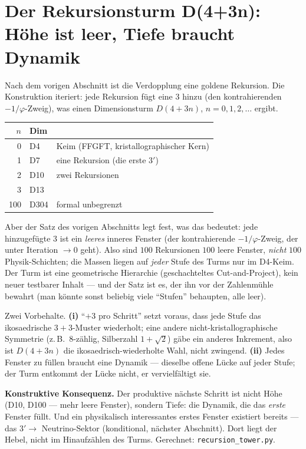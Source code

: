 \section{Der Rekursionsturm D(4+3n): H\"ohe ist leer, Tiefe braucht Dynamik}
Nach dem vorigen Abschnitt ist die Verdopplung eine goldene Rekursion. Die Konstruktion
iteriert: jede Rekursion f\"ugt eine $3$ hinzu (den kontrahierenden $-1/\varphi$-Zweig), was
einen Dimensionsturm $D(4+3n)$, $n=0,1,2,\dots$ ergibt.
\begin{center}\small\renewcommand{\arraystretch}{1.15}
\begin{tabular}{@{}r l l@{}}
\toprule
$n$ & Dim & \\
\midrule
0 & D4 & Keim (FFGFT, kristallographischer Kern) \\
1 & D7 & eine Rekursion (die erste $3'$) \\
2 & D10 & zwei Rekursionen \\
3 & D13 & \\
100 & D304 & formal unbegrenzt \\
\bottomrule
\end{tabular}
\end{center}
\noindent Aber der Satz des vorigen Abschnitts legt fest, was das bedeutet: jede hinzugef\"ugte
$3$ ist ein \emph{leeres} inneres Fenster (der kontrahierende $-1/\varphi$-Zweig, der unter
Iteration $\to0$ geht). Also sind $100$ Rekursionen $100$ leere Fenster, \emph{nicht} $100$
Physik-Schichten; die Massen liegen auf \emph{jeder} Stufe des Turms nur im D4-Keim. Der Turm
ist eine geometrische Hierarchie (geschachteltes Cut-and-Project), kein neuer testbarer Inhalt
--- und der Satz ist es, der ihn vor der Zahlenm\"uhle bewahrt (man k\"onnte sonst beliebig viele
\enquote{Stufen} behaupten, alle leer).

Zwei Vorbehalte. \textbf{(i)} \enquote{$+3$ pro Schritt} setzt voraus, dass jede Stufe das
ikosaedrische $3+3$-Muster wiederholt; eine andere nicht-kristallographische Symmetrie (z.\,B.\
$8$-z\"ahlig, Silberzahl $1+\sqrt2$) g\"abe ein anderes Inkrement, also ist $D(4+3n)$ die
ikosaedrisch-wiederholte Wahl, nicht zwingend. \textbf{(ii)} Jedes Fenster zu f\"ullen braucht
eine Dynamik --- dieselbe offene L\"ucke auf jeder Stufe; der Turm entkommt der L\"ucke nicht, er
vervielf\"altigt sie.

\medskip\noindent\textbf{Konstruktive Konsequenz.} Der produktive n\"achste Schritt ist nicht
H\"ohe (D10, D100 --- mehr leere Fenster), sondern Tiefe: die Dynamik, die das \emph{erste}
Fenster f\"ullt. Und ein physikalisch interessantes erstes Fenster existiert bereits --- das
$3'\to$ Neutrino-Sektor (konditional, n\"achster Abschnitt). Dort liegt der Hebel, nicht im
Hinaufz\"ahlen des Turms. Gerechnet: \texttt{recursion\_tower.py}.


